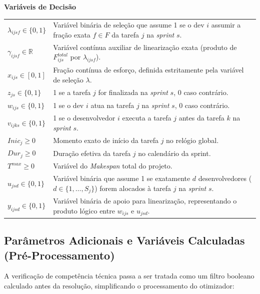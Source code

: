 \documentclass[a4paper,11pt]{article}
\begin{document}
\vspace{0.3cm}
\noindent\textbf{Variáveis de Decisão}
\begin{center}
    \begin{tabular}{p{2.5cm} p{12cm}}
        $\lambda_{ijsf} \in \{0, 1\}$ & Variável binária de seleção que assume 1 se o dev $i$ assumir a fração exata $f \in F$ da tarefa $j$ na \textit{sprint} $s$. \\
        $\gamma_{ijsf} \in \mathbb{R}$ & Variável contínua auxiliar de linearização exata (produto de $F^{total}_{ijs}$ por $\lambda_{ijsf}$). \\
        $x_{ijs} \in [0, 1]$ & Fração contínua de esforço, definida estritamente pela variável de seleção $\lambda$. \\
        $z_{js} \in \{0, 1\}$ & 1 se a tarefa $j$ for finalizada na \textit{sprint} $s$, 0 caso contrário. \\
        $w_{ijs} \in \{0, 1\}$ & 1 se o dev $i$ atua na tarefa $j$ na \textit{sprint} $s$, 0 caso contrário. \\
        $v_{ijks} \in \{0, 1\}$ & 1 se o desenvolvedor $i$ executa a tarefa $j$ antes da tarefa $k$ 
        na \textit{sprint} $s$. \\
        $Inic_{j} \ge 0$ & Momento exato de início da tarefa $j$ no relógio global. \\
        $Dur_{j} \ge 0$ & Duração efetiva da tarefa $j$ no calendário da sprint. \\
        $T^{max} \ge 0$ & Variável do \textit{Makespan} total do projeto. \\
        $u_{jsd} \in \{0, 1\}$ & Variável binária que assume 1 se exatamente $d$ desenvolvedores ($d \in \{1, \dots, S_j\}$) forem alocados à tarefa $j$ na \textit{sprint} $s$. \\
        $y_{ijsd} \in \{0, 1\}$ & Variável binária de apoio para linearização, representando o produto lógico entre $w_{ijs}$ e $u_{jsd}$.
    \end{tabular}
\end{center}

\subsection{Parâmetros Adicionais e Variáveis Calculadas (Pré-Processamento)}

A verificação de competência técnica passa a ser tratada como um filtro booleano 
calculado antes da resolução, simplificando o processamento do otimizador:
\end{document}
